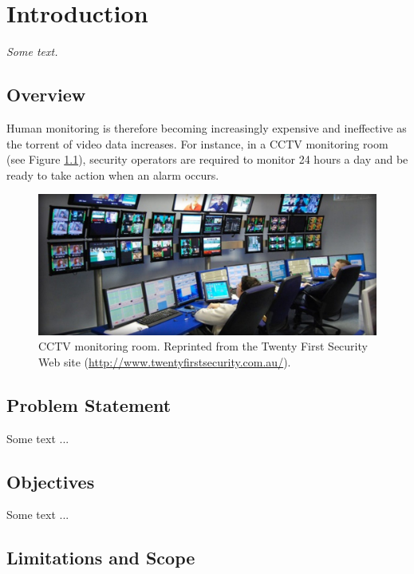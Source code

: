 \setlength{\footskip}{8mm}

\chapter{Introduction}

\textit{Some text.}

\section{Overview}

Human monitoring is therefore becoming
increasingly expensive and ineffective as the torrent of video data
increases. For instance, in a CCTV monitoring room (see
Figure \ref{fig:monitoring}), security operators are required to
monitor 24 hours a day and be ready to take action when an alarm
occurs. 

\begin{figure}[t]
  \centering
  \includegraphics[width=5in]{figures/monitoring}
  \caption[CCTV monitoring room.]{\small CCTV monitoring
    room. Reprinted from the Twenty First Security Web site
    (\url{http://www.twentyfirstsecurity.com.au/}).}
  \label{fig:monitoring}
\end{figure}

\section{Problem Statement}

Some text ...

\section{Objectives}

Some text ...

\section{Limitations and Scope}

